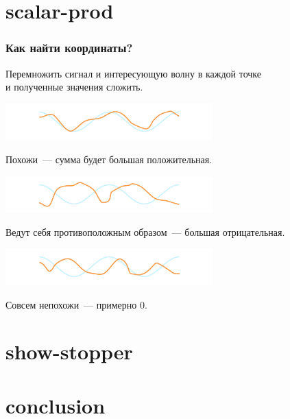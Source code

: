 \documentclass[11pt,aspectratio=169,svgnames]{beamer}
\begin{document}
\section{scalar-prod}

\begin{frame} \frametitle{Как найти координаты?}
Перемножить сигнал и интересующую волну в каждой точке \\
и полученные значения сложить. \medskip

\centerline{\includegraphics[width=0.6\textwidth]{img/sc_bigpos}}\vspace{-4mm}

Похожи~— сумма будет большая положительная. \medskip

\centerline{\includegraphics[width=0.6\textwidth]{img/sc_bigneg}}\vspace{-4mm}

Ведут себя противоположным образом~— большая отрицательная. \medskip

\centerline{\includegraphics[width=0.6\textwidth]{img/sc_orto}}\vspace{-4mm}

Совсем непохожи~— примерно 0.
\end{frame}

\section{show-stopper}



\section{conclusion}
\end{document}

